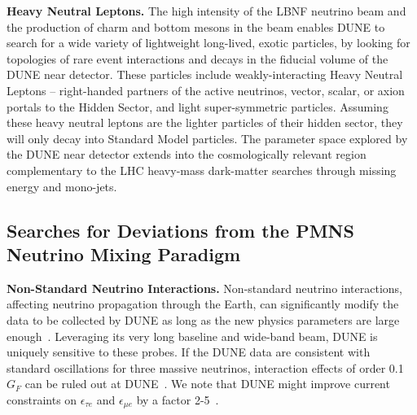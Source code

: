 {\bf Heavy Neutral Leptons.}
The high intensity of the LBNF neutrino beam and the production of charm and bottom mesons in the beam enables DUNE to search for a wide variety of lightweight long-lived, exotic particles, by looking for topologies of rare event interactions and decays in the fiducial volume of the DUNE near detector. These particles include weakly-interacting Heavy Neutral Leptons -- right-handed partners of the active neutrinos, vector, scalar, or axion portals to the Hidden Sector, and light super-symmetric particles.  
Assuming these heavy neutral leptons are the lighter particles of their hidden sector, they will only decay into Standard Model particles.
The parameter space explored by the DUNE near detector extends into the cosmologically relevant region complementary to the LHC heavy-mass dark-matter searches through missing energy and mono-jets. 



\subsection{Searches for Deviations from the PMNS Neutrino Mixing Paradigm}
{\bf Non-Standard Neutrino Interactions.}
Non-standard neutrino interactions, affecting neutrino propagation through the Earth, can significantly modify the data to be collected by DUNE as long as the new physics parameters are large enough~\cite{Masud:2015xva}. Leveraging its very long baseline and wide-band beam, DUNE is uniquely sensitive to  these probes. If the DUNE data are consistent with standard oscillations for three massive neutrinos, interaction effects of order 0.1 $G_F$ can be ruled out at DUNE~\cite{deGouvea:2015ndi,Coloma:2015kiu}. We note that DUNE might improve current constraints on $\epsilon_{\tau e}$ and $\epsilon_{\mu e}$ by a factor 2-5~\cite{Farzan:2017xzy}.

